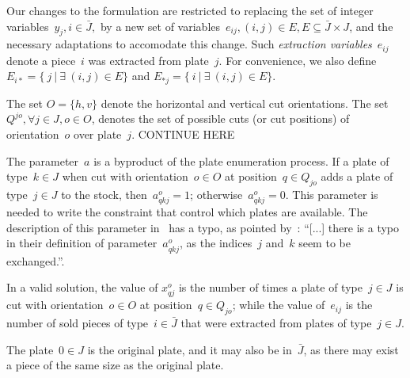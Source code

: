 \documentclass[runningheads]{llncs}
\begin{document}
Our changes to the formulation are restricted to replacing the set of integer variables~\(y_j, i \in \bar{J},\) by a new set of variables~\(e_{ij}, (i, j) \in E, E \subseteq \bar{J} \times J\), and the necessary adaptations to accomodate this change.
Such \emph{extraction variables}~\(e_{ij}\) denote a piece~\(i\) was extracted from plate~\(j\).
For convenience, we also define \(E_{i*} = \{~j~|~\exists~(i, j) \in E \}\) and \(E_{*j} = \{~i~|~\exists~(i, j) \in E \}\).

The set \(O = \{h, v\}\) denote the horizontal and vertical cut orientations.
The set \(Q^{jo}, \forall j \in J, o \in O\), denotes the set of possible cuts (or cut positions) of orientation~\(o\) over plate~\(j\). CONTINUE HERE

The parameter~\(a\) is a byproduct of the plate enumeration process. If a plate of type~\(k \in J\) when cut with orientation~\(o \in O\) at position~\(q \in Q_{jo}\) adds a plate of type~\(j \in J\) to the stock, then~\(a^o_{qkj} = 1\); otherwise~\(a^o_{qkj} = 0\). This parameter is needed to write the constraint that control which plates are available. The description of this parameter in~\cite{furini:2016} has a typo, as pointed by~\cite{martin:2020}: ``[...] there is a typo in their definition of parameter~\(a^o_{qkj}\), as the indices~\(j\) and~\(k\) seem to be exchanged.''.

In a valid solution, the value of \(x^o_{qj}\) is the number of times a plate of type~\(j \in J\) is cut with orientation~\(o \in O\) at position~\(q \in Q_{jo}\); while the value of~\(e_{ij}\) is the number of sold pieces of type~\(i \in \bar{J}\) that were extracted from plates of type~\(j \in J\).

The plate~\(0 \in J\) is the original plate, and it may also be in~\(\bar{J}\), as there may exist a piece of the same size as the original plate.
\end{document}
